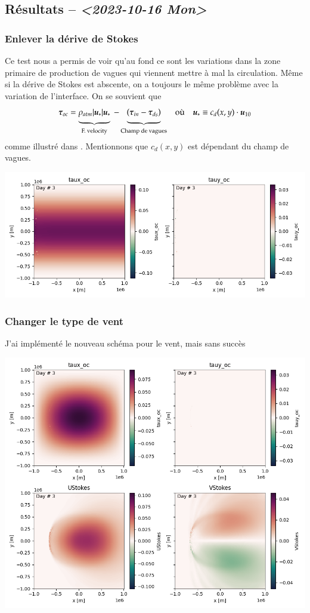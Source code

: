 \documentclass[10pt]{article}
\numberwithin{equation}{section}
\newcommand{\uu}{\vb*{u}}
\newcommand{\tall}{\vphantom{A^{x^x}_p}}
\begin{document}
\newpage

\subsection{Résultats -- \textit{<2023-10-16 Mon>}}
\label{sec:org007513e}

\subsubsection{Enlever la dérive de Stokes}
\label{sec:org163d722}
Ce test nous a permis de voir qu'au fond ce sont les variations dans la zone primaire de production de vagues qui viennent mettre à mal la circulation.
Même si la dérive de Stokes est abscente, on a toujours le même problème avec la variation de l'interface.
On se souvient que
\begin{align}
   && \boldsymbol{\tau}_{oc} = \underbrace{\rho_{atm} |\uu_*|\uu_*\tall}_\text{F. velocity} \ - \underbrace{\qty(\boldsymbol{\tau}_{in} - \boldsymbol{\tau}_{ds})\tall}_\text{Champ de vagues} && \text{où} && \uu_* \equiv c_d(x,y)\cdot\uu_{10} &&
\end{align}
comme illustré dans \citep{breivik_al_2015}.
Mentionnons que \(c_d(x,y)\) est dépendant du champ de vagues. 
\begin{center}
\includegraphics[width=.9\linewidth]{figures/debuggage/2023_10_16_nostokes_tauoc.png}
\end{center}

\subsubsection{Changer le type de vent}
\label{sec:org4f15731}
J'ai implémenté le nouveau schéma pour le vent, mais sans succès

\begin{center}
\includegraphics[width=.9\linewidth]{figures/debuggage/2023_10_16_ramp_tauETUstokes.png}
\end{center}




\end{document}
